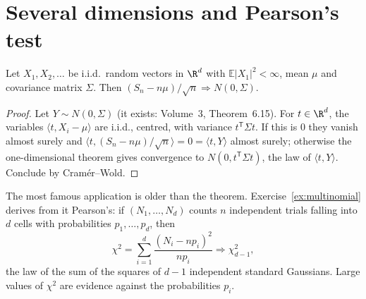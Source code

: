 \section{Several dimensions and Pearson's test}

\begin{theorem}\label{thm:multiclt}
Let $X_1,X_2,\dots$ be i.i.d.\ random vectors in $\R^d$ with $\mathbb E|X_1|^2<\infty$, mean $\mu$ and covariance matrix $\Sigma$. Then
$(S_n-n\mu)/\sqrt n\Rightarrow N(0,\Sigma)$.
\end{theorem}
\begin{proof}
Let $Y\sim N(0,\Sigma)$ (it exists: Volume~3, Theorem~6.15). For $t\in\R^d$, the variables $\langle t,X_i-\mu\rangle$ are i.i.d., centred, with variance
$t^{\mathsf T}\Sigma t$. If this is $0$ they vanish almost surely and $\langle t,(S_n-n\mu)/\sqrt n\rangle=0=\langle t,Y\rangle$ almost surely; otherwise the
one-dimensional theorem gives convergence to $N(0,t^{\mathsf T}\Sigma t)$, the law of $\langle t,Y\rangle$. Conclude by Cram\'er--Wold.
\end{proof}

The most famous application is older than the theorem. Exercise~\ref{ex:multinomial} derives from it Pearson's: if $(N_1,\dots,N_d)$ counts $n$
independent trials falling into $d$ cells with probabilities $p_1,\dots,p_d$, then
\[
\chi^2=\sum_{i=1}^d\frac{(N_i-np_i)^2}{np_i}\Rightarrow\chi^2_{d-1},
\]
the law of the sum of the squares of $d-1$ independent standard Gaussians. Large values of $\chi^2$ are evidence against the probabilities $p_i$.

